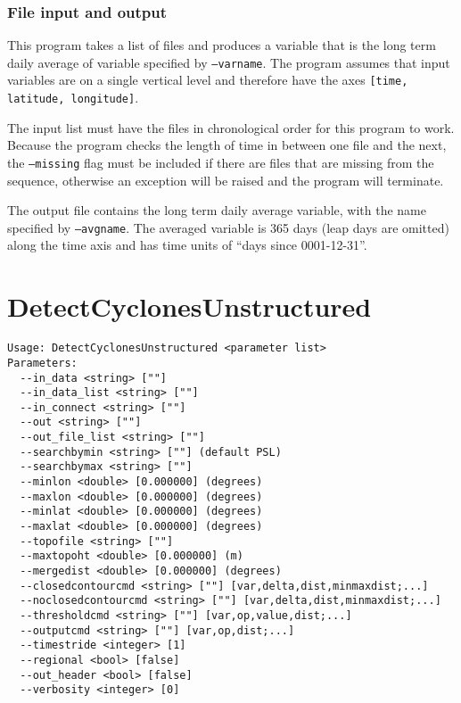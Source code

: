 \documentclass{article}
\begin{document}
\subsubsection{File input and output}
This program takes a list of files and produces a variable that is the long term daily average of variable specified by \texttt{--varname}. The program assumes that input variables are on a single vertical level and therefore have the axes \texttt{[time, latitude, longitude]}. 

The input list must have the files in chronological order for this program to work. Because the program checks the length of time in between one file and the next, the \texttt{--missing} flag must be included if there are files that  are missing from the sequence, otherwise an exception will be raised and the program will terminate.

The output file contains the long term daily average variable, with the name specified by \texttt{--avgname}. The averaged variable is 365 days (leap days are omitted) along the time axis and has time units of ``days since 0001-12-31''.









\section{DetectCyclonesUnstructured}

\begin{verbatim}
Usage: DetectCyclonesUnstructured <parameter list>
Parameters:
  --in_data <string> [""] 
  --in_data_list <string> [""]
  --in_connect <string> [""] 
  --out <string> [""] 
  --out_file_list <string> [""]
  --searchbymin <string> [""] (default PSL)
  --searchbymax <string> [""] 
  --minlon <double> [0.000000] (degrees)
  --maxlon <double> [0.000000] (degrees)
  --minlat <double> [0.000000] (degrees)
  --maxlat <double> [0.000000] (degrees)
  --topofile <string> [""] 
  --maxtopoht <double> [0.000000] (m)
  --mergedist <double> [0.000000] (degrees)
  --closedcontourcmd <string> [""] [var,delta,dist,minmaxdist;...]
  --noclosedcontourcmd <string> [""] [var,delta,dist,minmaxdist;...]
  --thresholdcmd <string> [""] [var,op,value,dist;...]
  --outputcmd <string> [""] [var,op,dist;...]
  --timestride <integer> [1] 
  --regional <bool> [false] 
  --out_header <bool> [false] 
  --verbosity <integer> [0] 
\end{verbatim}
\end{document}
